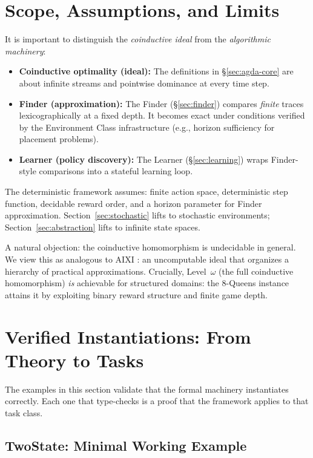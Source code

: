 \documentclass[9pt,a4paper]{article}
\theoremstyle{plain}
\theoremstyle{definition}
\theoremstyle{remark}
\begin{document}
\section{Scope, Assumptions, and Limits}

It is important to distinguish the \emph{coinductive ideal} from the \emph{algorithmic machinery}:
\begin{itemize}
\item \textbf{Coinductive optimality (ideal):} The definitions in \S\ref{sec:agda-core} are about infinite streams and pointwise dominance at every time step.
\item \textbf{Finder (approximation):} The Finder (\S\ref{sec:finder}) compares \emph{finite} traces lexicographically at a fixed depth.  It becomes exact under conditions verified by the Environment Class infrastructure (e.g., horizon sufficiency for placement problems).
\item \textbf{Learner (policy discovery):} The Learner (\S\ref{sec:learning}) wraps Finder-style comparisons into a stateful learning loop.
\end{itemize}

The deterministic framework assumes: finite action space, deterministic step function, decidable reward order, and a horizon parameter for Finder approximation.  Section~\ref{sec:stochastic} lifts to stochastic environments; Section~\ref{sec:abstraction} lifts to infinite state spaces.

A natural objection: the coinductive homomorphism is undecidable in general.  We view this as analogous to AIXI \cite{Hutter2005}: an uncomputable ideal that organizes a hierarchy of practical approximations.  Crucially, Level~$\omega$ (the full coinductive homomorphism) \emph{is} achievable for structured domains: the 8-Queens instance attains it by exploiting binary reward structure and finite game depth.

\section{Verified Instantiations: From Theory to Tasks}

The examples in this section validate that the formal machinery instantiates correctly.  Each one that type-checks is a proof that the framework applies to that task class.

\subsection{TwoState: Minimal Working Example}
\end{document}
